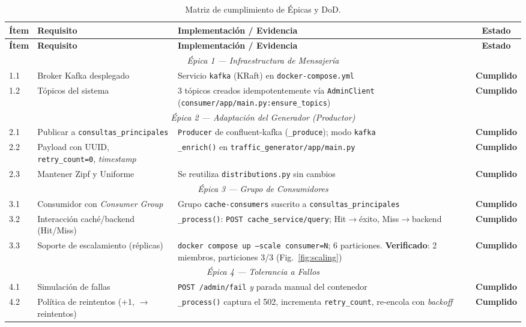 \documentclass[11pt,a4paper]{article}
\newcommand{\chk}{{\color{kgreen}\textbf{Cumplido}}}
\begin{document}
\begin{longtable}{@{}p{1.1cm}p{5.3cm}p{6.8cm}c@{}}
\caption{Matriz de cumplimiento de Épicas y DoD.}\label{tab:cumplimiento}\\
\toprule
\textbf{Ítem} & \textbf{Requisito} & \textbf{Implementación / Evidencia} & \textbf{Estado} \\
\midrule
\endfirsthead
\toprule
\textbf{Ítem} & \textbf{Requisito} & \textbf{Implementación / Evidencia} & \textbf{Estado} \\
\midrule
\endhead
\multicolumn{4}{c}{\textit{Épica 1 --- Infraestructura de Mensajería}}\\
\midrule
1.1 & Broker Kafka desplegado & Servicio \texttt{kafka} (KRaft) en \texttt{docker-compose.yml} & \chk \\
1.2 & Tópicos del sistema & 3 tópicos creados idempotentemente vía \texttt{AdminClient} (\texttt{consumer/app/main.py:ensure\_topics}) & \chk \\
\midrule
\multicolumn{4}{c}{\textit{Épica 2 --- Adaptación del Generador (Productor)}}\\
\midrule
2.1 & Publicar a \texttt{consultas\_principales} & \texttt{Producer} de confluent-kafka (\texttt{\_produce}); modo \texttt{kafka} & \chk \\
2.2 & Payload con UUID, \texttt{retry\_count=0}, \emph{timestamp} & \texttt{\_enrich()} en \texttt{traffic\_generator/app/main.py} & \chk \\
2.3 & Mantener Zipf y Uniforme & Se reutiliza \texttt{distributions.py} sin cambios & \chk \\
\midrule
\multicolumn{4}{c}{\textit{Épica 3 --- Grupo de Consumidores}}\\
\midrule
3.1 & Consumidor con \emph{Consumer Group} & Grupo \texttt{cache-consumers} suscrito a \texttt{consultas\_principales} & \chk \\
3.2 & Interacción caché/backend (Hit/Miss) & \texttt{\_process()}: \texttt{POST cache\_service/query}; Hit$\to$éxito, Miss$\to$backend & \chk \\
3.3 & Soporte de escalamiento (réplicas) & \texttt{docker compose up --scale consumer=N}; 6 particiones. \textbf{Verificado}: 2 miembros, particiones 3/3 (Fig.~\ref{fig:scaling}) & \chk \\
\midrule
\multicolumn{4}{c}{\textit{Épica 4 --- Tolerancia a Fallos}}\\
\midrule
4.1 & Simulación de fallas & \texttt{POST /admin/fail} \emph{y} parada manual del contenedor & \chk \\
4.2 & Política de reintentos ($+1$, $\to$ reintentos) & \texttt{\_process()} captura el 502, incrementa \texttt{retry\_count}, re-encola con \emph{backoff} & \chk \\

\end{longtable}
\end{document}
